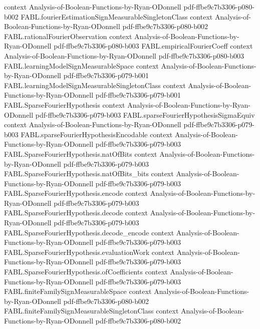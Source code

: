 \begin{theorem}
  {context}
  {Analysis-of-Boolean-Functions-by-Ryan-ODonnell}
  {pdf-ffbe9c7b3306-p080-b002}
\proofstep
  {FABL.fourierEstimationSignMeasurableSingletonClass}
  {context}
  {Analysis-of-Boolean-Functions-by-Ryan-ODonnell}
  {pdf-ffbe9c7b3306-p080-b002}
\proofstep
  {FABL.rationalFourierObservation}
  {context}
  {Analysis-of-Boolean-Functions-by-Ryan-ODonnell}
  {pdf-ffbe9c7b3306-p080-b003}
\proofstep
  {FABL.empiricalFourierCoeff}
  {context}
  {Analysis-of-Boolean-Functions-by-Ryan-ODonnell}
  {pdf-ffbe9c7b3306-p080-b003}
\proofstep
  {FABL.learningModelSignMeasurableSpace}
  {context}
  {Analysis-of-Boolean-Functions-by-Ryan-ODonnell}
  {pdf-ffbe9c7b3306-p079-b001}
\proofstep
  {FABL.learningModelSignMeasurableSingletonClass}
  {context}
  {Analysis-of-Boolean-Functions-by-Ryan-ODonnell}
  {pdf-ffbe9c7b3306-p079-b001}
\proofstep
  {FABL.SparseFourierHypothesis}
  {context}
  {Analysis-of-Boolean-Functions-by-Ryan-ODonnell}
  {pdf-ffbe9c7b3306-p079-b003}
\proofstep
  {FABL.sparseFourierHypothesisSigmaEquiv}
  {context}
  {Analysis-of-Boolean-Functions-by-Ryan-ODonnell}
  {pdf-ffbe9c7b3306-p079-b003}
\proofstep
  {FABL.sparseFourierHypothesisEncodable}
  {context}
  {Analysis-of-Boolean-Functions-by-Ryan-ODonnell}
  {pdf-ffbe9c7b3306-p079-b003}
\proofstep
  {FABL.SparseFourierHypothesis.natOfBits}
  {context}
  {Analysis-of-Boolean-Functions-by-Ryan-ODonnell}
  {pdf-ffbe9c7b3306-p079-b003}
\proofstep
  {FABL.SparseFourierHypothesis.natOfBits_bits}
  {context}
  {Analysis-of-Boolean-Functions-by-Ryan-ODonnell}
  {pdf-ffbe9c7b3306-p079-b003}
\proofstep
  {FABL.SparseFourierHypothesis.encode}
  {context}
  {Analysis-of-Boolean-Functions-by-Ryan-ODonnell}
  {pdf-ffbe9c7b3306-p079-b003}
\proofstep
  {FABL.SparseFourierHypothesis.decode}
  {context}
  {Analysis-of-Boolean-Functions-by-Ryan-ODonnell}
  {pdf-ffbe9c7b3306-p079-b003}
\proofstep
  {FABL.SparseFourierHypothesis.decode_encode}
  {context}
  {Analysis-of-Boolean-Functions-by-Ryan-ODonnell}
  {pdf-ffbe9c7b3306-p079-b003}
\proofstep
  {FABL.SparseFourierHypothesis.evaluationWork}
  {context}
  {Analysis-of-Boolean-Functions-by-Ryan-ODonnell}
  {pdf-ffbe9c7b3306-p079-b003}
\proofstep
  {FABL.SparseFourierHypothesis.ofCoefficients}
  {context}
  {Analysis-of-Boolean-Functions-by-Ryan-ODonnell}
  {pdf-ffbe9c7b3306-p079-b003}
\proofstep
  {FABL.finiteFamilySignMeasurableSpace}
  {context}
  {Analysis-of-Boolean-Functions-by-Ryan-ODonnell}
  {pdf-ffbe9c7b3306-p080-b002}
\proofstep
  {FABL.finiteFamilySignMeasurableSingletonClass}
  {context}
  {Analysis-of-Boolean-Functions-by-Ryan-ODonnell}
  {pdf-ffbe9c7b3306-p080-b002}

\end{theorem}
